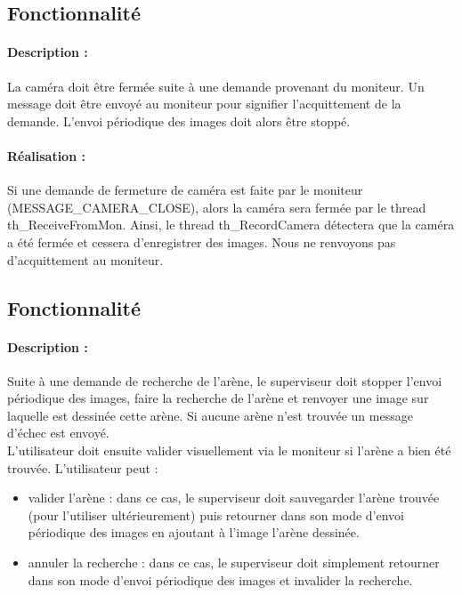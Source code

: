 \documentclass[11pt, a4paper]{paper}
\newcounter{cptreq}
\begin{document}
{{\subsection{Fonctionnalité \thecptreq}

\paragraph{Description :} La caméra doit être fermée suite à une demande provenant du moniteur. Un message doit être envoyé au moniteur pour signifier l'acquittement de la demande. L'envoi périodique des images doit alors être stoppé.

\paragraph{\color{black}Réalisation :}  {\color{black} Si une demande de fermeture de caméra est faite par le moniteur (MESSAGE\_CAMERA\_CLOSE), alors la caméra sera fermée par le thread th\_ReceiveFromMon. Ainsi, le thread th\_RecordCamera détectera que la caméra a été fermée et cessera d'enregistrer des images. Nous ne renvoyons pas d'acquittement au moniteur.  }
\subsection{Fonctionnalité \thecptreq}

\paragraph{Description :} Suite à une demande de recherche de l'arène, le superviseur doit stopper l'envoi périodique des images, faire la recherche de l'arène et renvoyer une image sur laquelle est dessinée cette arène. Si aucune arène n'est trouvée un message d'échec est envoyé.\\

L'utilisateur doit ensuite valider visuellement via le moniteur si l'arène a bien été trouvée. L'utilisateur peut :
\begin{itemize}
	\item valider l'arène : dans ce cas, le superviseur doit sauvegarder l'arène trouvée (pour l'utiliser ultérieurement) puis retourner dans son mode d'envoi périodique des images en ajoutant à l'image l'arène dessinée.
 	\item annuler la recherche : dans ce cas, le superviseur doit simplement retourner dans son mode d'envoi périodique des images et invalider la recherche.
\end{itemize}

}}
\end{document}
